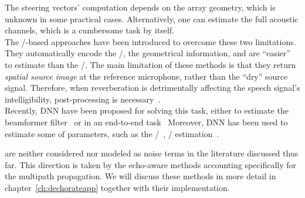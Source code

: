 The steering vectors' computation depends on the array geometry, which is unknown in some practical cases.
Alternatively, one can estimate the full acoustic channels, which is a cumbersome task by itself.
\\The \ReTF/-based approaches have been introduced to overcome these two limitations.
They automatically encode the \RIRs/, the geometrical information, and are ``easier'' to estimate than the \RIRs/.
The main limitation of these methods is that they return \textit{spatial source image} at the reference microphone, rather than the ``dry'' source signal.
Therefore, when reverberation is detrimentally affecting the speech signal's intelligibility, post-processing is necessary~.
\\Recently, \ac{DNN} have been proposed for solving this task, either to estimate the beamformer filter~ or in an end-to-end task~
Moreover, \ac{DNN} has been used to estimate some of parameters, such as the \DOAs/~, \ReTF/ estimation~.


 are neither considered nor modeled as noise terms in the literature discussed thus far.
This direction is taken by the echo-aware methods accounting specifically for the multipath propagation.
We will discuss these methods in more detail in chapter~\cref{ch:dechorateapp} together with their implementation.

